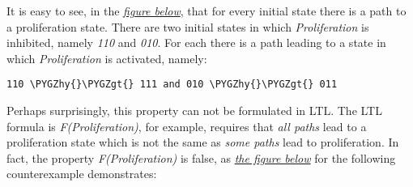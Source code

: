 \documentclass[letterpaper,10pt,english]{sphinxmanual}
\def\PYGZgt{\char`\>}
\def\PYGZhy{\char`\-}
\begin{document}
It is easy to see, in the {\hyperref[Manual:figure20]{\emph{figure below}}}, that for every initial state there is a path to a proliferation state.
There are two initial states in which \emph{Proliferation} is inhibited, namely \emph{110} and \emph{010}.
For each there is a path leading to a state in which \emph{Proliferation} is activated, namely:

\begin{Verbatim}[commandchars=\\\{\}]
110 \PYGZhy{}\PYGZgt{} 111 and 010 \PYGZhy{}\PYGZgt{} 011
\end{Verbatim}

Perhaps surprisingly, this property can not be formulated in LTL.
The LTL formula is \emph{F(Proliferation)}, for example, requires that \emph{all paths} lead to a proliferation state which is
not the same as \emph{some paths} lead to proliferation.
In fact, the property \emph{F(Proliferation)} is false, as {\hyperref[Manual:figure21]{\emph{the figure below}}} for the following counterexample demonstrates:
\end{document}
